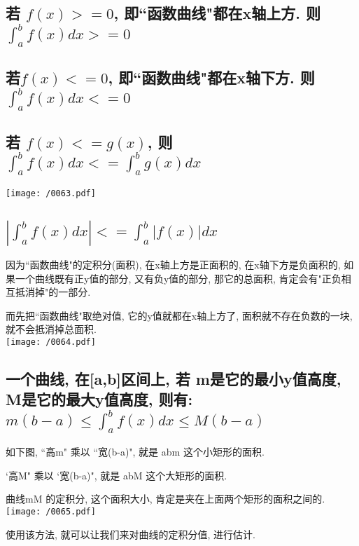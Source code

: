 \documentclass[UTF8]{ctexart}
\begin{document}
	\subsection{若 $ f(x) >= 0$, 即``函数曲线"都在x轴上方.  则$ \int_a^b f(x) dx >= 0$}
	
	\subsection{若$ f(x) <= 0$, 即``函数曲线"都在x轴下方.  则  $\int_a^b f(x) dx <= 0$}
	
	\subsection{若 $ f(x) <= g(x)$, 则 $ \int_a^b f(x) dx  <=  \int_a^b g(x) dx$ }
	
	\texttt{[image: /0063.pdf]}
	
	
	\subsection{$|\int_a^b f(x) dx | <= \int_a^b |f(x)| dx$} 
	
	因为``函数曲线"的定积分(面积), 在x轴上方是正面积的, 在x轴下方是负面积的, 如果一个曲线既有正y值的部分, 又有负y值的部分, 那它的总面积, 肯定会有"正负相互抵消掉"的一部分.
	
	而先把``函数曲线"取绝对值, 它的y值就都在x轴上方了, 面积就不存在负数的一块, 就不会抵消掉总面积. \\
	
	\texttt{[image: /0064.pdf]}	
	
	
	
	\subsection{一个曲线, 在[a,b]区间上, 若 m是它的最小y值高度, M是它的最大y值高度, 则有: $ m(b-a) \leq \int_a^b f(x) dx  \leq M(b-a)$}
	
	如下图, ``高m" 乘以 ``宽(b-a)", 就是 abm 这个小矩形的面积.
	
	`高M" 乘以 `宽(b-a)", 就是 abM 这个大矩形的面积.
	
	曲线mM 的定积分, 这个面积大小, 肯定是夹在上面两个矩形的面积之间的. \\
	
	\texttt{[image: /0065.pdf]}
	
	使用该方法, 就可以让我们来对曲线的定积分值, 进行估计.
	
\end{document}
